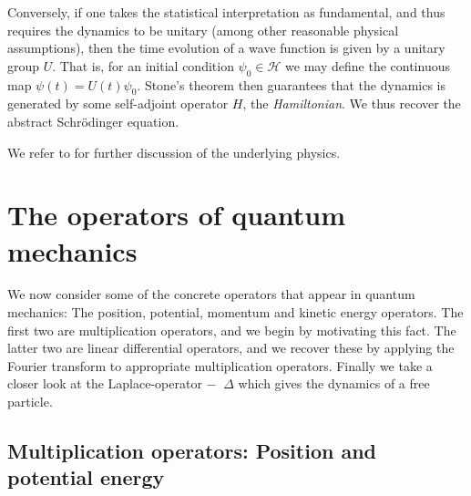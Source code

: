 \documentclass[article, a4paper, 11pt, oneside]{memoir}
\numberwithin{equation}{chapter}
\newcommand{\calH}{\mathcal{H}}
\theoremstyle{myexample}
\theoremstyle{myexample}
\theoremstyle{myexamplebreak}
\theoremstyle{myexamplebreak}
\theoremstyle{nonumberplain}
\theoremstyle{MyNonumberplain}
\begin{document}
Conversely, if one takes the statistical interpretation as fundamental, and thus requires the dynamics to be unitary (among other reasonable physical assumptions), then the time evolution of a wave function is given by a unitary group $U$. That is, for an initial condition $\psi_0 \in \calH$ we may define the continuous map $\psi(t) = U(t) \psi_0$. Stone's theorem then guarantees that the dynamics is generated by some self-adjoint operator $H$, the \emph{Hamiltonian}. We thus recover the abstract Schrödinger equation.

We refer to \textcite[Chapter~2]{sakurai2011} for further discussion of the underlying physics. \newpage





\chapter{The operators of quantum mechanics}
\label{sec:qm_operators}

\newcommand{\fourier}{\mathcal{F}}
\newcommand{\laplace}{\mathop{}\!\Delta}
\newcommand{\expectation}{\mathbb{E}}

We now consider some of the concrete operators that appear in quantum mechanics: The position, potential, momentum and kinetic energy operators. The first two are multiplication operators, and we begin by motivating this fact. The latter two are linear differential operators, and we recover these by applying the Fourier transform to appropriate multiplication operators. Finally we take a closer look at the Laplace-operator $-\laplace$ which gives the dynamics of a free particle.


\section{Multiplication operators: Position and potential energy}
\end{document}
